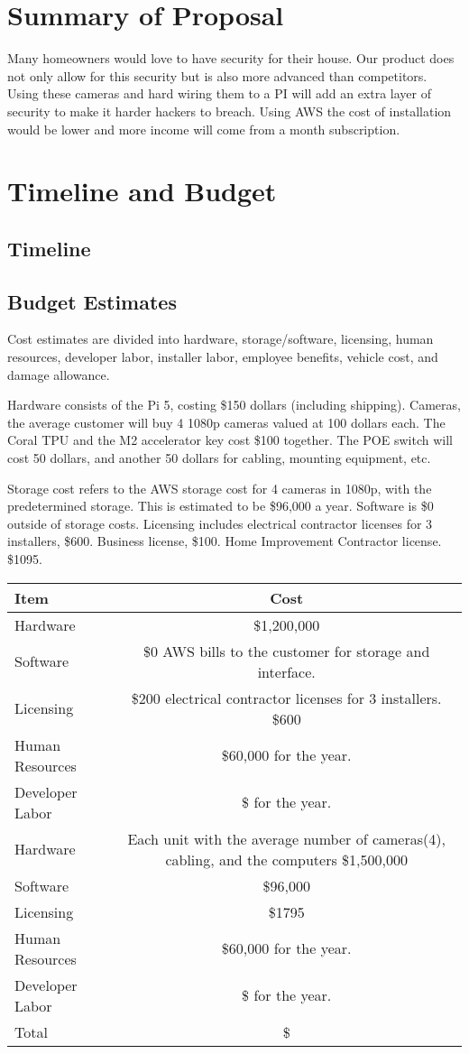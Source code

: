 \documentclass{report}
\begin{document}
\chapter{Summary of Proposal}
Many homeowners would love to have security for their house.
Our product does not only allow for this security but is also more advanced than competitors.
Using these cameras and hard wiring them to a PI will add an extra layer of security to make it harder hackers to breach.
Using AWS the cost of installation would be lower and more income will come from a month subscription.




\chapter{Timeline and Budget}
\section{Timeline}

\section{Budget Estimates}
Cost estimates are divided into hardware, 
storage/software, licensing, human resources,
developer labor, installer labor, employee benefits, 
vehicle cost, and damage allowance.

Hardware consists of the Pi 5, costing \$150 dollars (including shipping). Cameras, 
the average customer will buy 4 1080p cameras valued at 100 dollars each. 
The Coral TPU and the M2 accelerator key cost \$100 together.
The POE switch will cost 50 dollars, and another 50 dollars for cabling, mounting equipment, etc.

Storage cost refers to the AWS storage cost for 4 cameras in 1080p, with the predetermined storage. This is estimated to be \$96,000 a year.
Software is \$0 outside of storage costs.
Licensing includes electrical contractor licenses for 3 installers, \$600. Business license, \$100. 
Home Improvement Contractor license. \$1095.
\begin{tabular}{|l|c|}
\hline
Item & Cost \\
\hline
Hardware & \$1,200,000 \\
Software & \$0 AWS bills to the customer for storage and interface. \\
Licensing & \$200 electrical contractor licenses for 3 installers. \$600 \\
Human Resources & \$60,000 for the year. \\
Developer Labor & \$ for the year. \\
Hardware & Each unit with the average number of cameras(4),
cabling, and the computers \$1,500,000\\
Software & \$96,000\\
Licensing & \$1795 \\
Human Resources & \$60,000 for the year.\\
Developer Labor & \$ for the year.\\
\hline
Total & \$ \\
\hline
\end{tabular}
\end{document}
